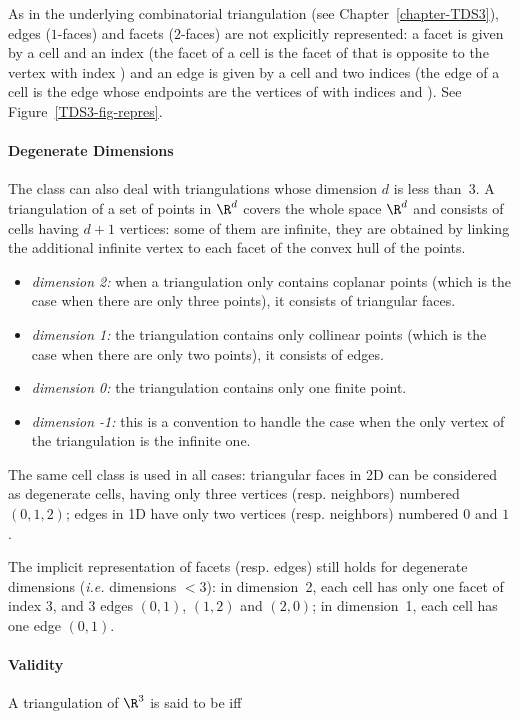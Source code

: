 As in the underlying combinatorial triangulation (see
Chapter~\ref{chapter-TDS3}), edges ($1$-faces) and facets ($2$-faces)
are not explicitly 
represented: a facet is given by a cell and an index (the facet
 of a cell  is the facet of  that is opposite to
the vertex with index ) and an edge is given by a cell and two
indices (the edge  of a cell  is the edge whose
endpoints are the vertices of  with indices  and
). See Figure~\ref{TDS3-fig-repres}.  

\paragraph{Degenerate Dimensions}
The class  can also deal with
triangulations whose dimension $d$ is less than~3. A triangulation of a
set of points in $\R^d$ covers the whole space $\R^d$ and consists of
cells having $d+1$ vertices: some of them are infinite, they are
obtained by linking the additional infinite vertex to each facet of
the convex hull of the points.
\begin{itemize}
\item {} \emph{dimension 2:} when a triangulation only contains
coplanar points (which is the case when there are only three points), 
it consists of triangular faces.
\item {} \emph{dimension 1:} the triangulation contains only collinear 
points (which is the case when there are only two points), it consists
of edges.
\item {} \emph{dimension 0:} the triangulation contains only one
finite point.
\item {} \emph{dimension -1:} this is a convention to handle the case
when the only vertex of the triangulation is the infinite one.
\end{itemize} 

The same cell class is used in all cases: triangular faces in
2D can be considered as degenerate cells, having only three vertices
(resp. neighbors) numbered $(0,1,2)$;
edges in 1D have only two vertices (resp. neighbors) numbered $0$ and $1$. 

The implicit representation of facets (resp. edges) still holds
for degenerate dimensions (\textit{i.e.} dimensions $<3$): in
dimension~2, each cell has only one facet of index 3, and 3 edges
$(0,1)$, $(1,2)$ and $(2,0)$; in dimension~1, each cell has one edge
$(0,1)$.  

\paragraph{Validity}
A triangulation of $\R^3$ is said to be  iff


